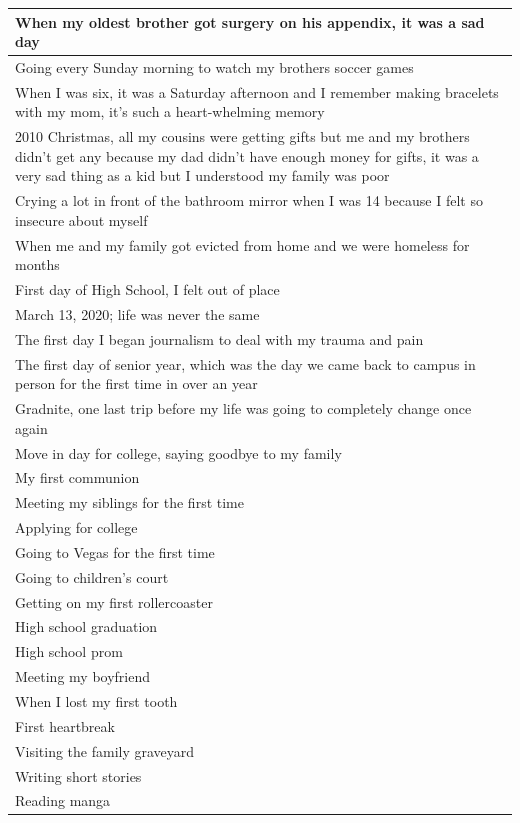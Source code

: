 \documentclass[
  .7em,
  letterpaper,
  DIV=11,
  numbers=noendperiod]{scrartcl}
\begin{document}
\begin{table}
\begin{tabular}{l}
\hline
When my oldest brother got surgery on his appendix, it was a sad day\\
\hline
Going every Sunday morning to watch my brothers soccer games\\
\hline
When I was six, it was a Saturday afternoon and I remember making bracelets with my mom, it's such a heart-whelming memory\\
\hline
2010 Christmas, all my cousins were getting gifts but me and my brothers didn't get any because my dad didn't have enough money for gifts, it was a very sad thing as a kid but I understood my family was poor\\
\hline
Crying a lot in front of the bathroom mirror when I was 14 because I felt so insecure about myself\\
\hline
When me and my family got evicted from home and we were homeless for months\\
\hline
First day of High School, I felt out of place\\
\hline
March 13, 2020; life was never the same\\
\hline
The first day I began journalism to deal with my trauma and pain\\
\hline
The first day of senior year, which was the day we came back to campus in person for the first time in over an year\\
\hline
Gradnite, one last trip before my life was going to completely change once again\\
\hline
Move in day for college, saying goodbye to my family\\
\hline
My first communion\\
\hline
Meeting my siblings for the first time\\
\hline
Applying for college\\
\hline
Going to Vegas for the first time\\
\hline
Going to children's court\\
\hline
Getting on my first rollercoaster\\
\hline
High school graduation\\
\hline
High school prom\\
\hline
Meeting my boyfriend\\
\hline
When I lost my first tooth\\
\hline
First heartbreak\\
\hline
Visiting the family graveyard\\
\hline
Writing short stories\\
\hline
Reading manga\\

\end{tabular}
\end{table}
\end{document}
